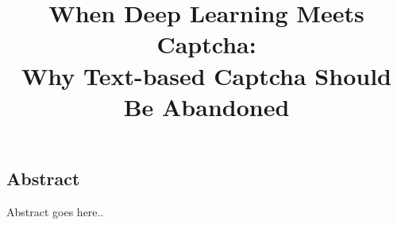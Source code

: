 \documentclass[letterpaper,twocolumn,10pt]{article}
\begin{document}

\title{When Deep Learning Meets Captcha: \\ Why Text-based Captcha Should Be Abandoned}
\author{
}


\maketitle

\subsection*{Abstract}
Abstract goes here..








%






%
%


{\footnotesize


}
\end{document}
